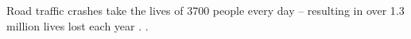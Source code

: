 
Road traffic crashes take the lives of 3700 people every day -- resulting in over 1.3 million lives lost each year \cite{who2018roadsafetyreport}. \cite{who2017savelives}.
